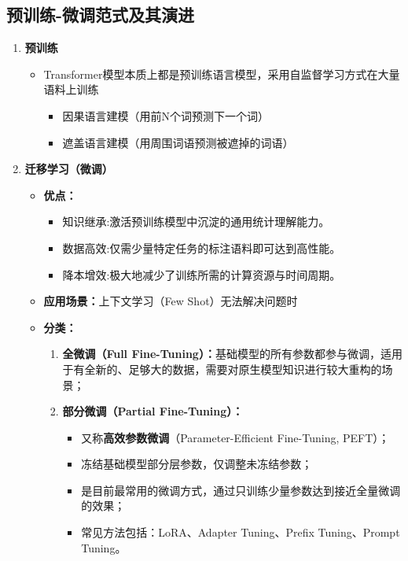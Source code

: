 \documentclass[../main.tex]{subfiles}
\begin{document}
\subsection{预训练-微调范式及其演进}
\begin{enumerate}
    \item \textbf{预训练}
    \begin{itemize}
        \item Transformer模型本质上都是预训练语言模型，采用自监督学习方式在大量语料上训练
        \begin{itemize}
            \item 因果语言建模（用前N个词预测下一个词）
            \item 遮盖语言建模（用周围词语预测被遮掉的词语）
        \end{itemize}
    \end{itemize}
    \item \textbf{迁移学习（微调）}
    \begin{itemize}
        \item \textbf{优点：}
        \begin{itemize}
            \item 知识继承:激活预训练模型中沉淀的通用统计理解能力。
            \item 数据高效:仅需少量特定任务的标注语料即可达到高性能。
            \item 降本增效:极大地减少了训练所需的计算资源与时间周期。
        \end{itemize}
        \item \textbf{应用场景：}上下文学习（Few Shot）无法解决问题时
        \item \textbf{分类：}
        \begin{enumerate}
            \item \textbf{全微调（Full Fine-Tuning）：}基础模型的所有参数都参与微调，适用于有全新的、足够大的数据，需要对原生模型知识进行较大重构的场景；
            
            \item \textbf{部分微调（Partial Fine-Tuning）：}
            \begin{itemize}
                \item 又称\textbf{高效参数微调}（Parameter-Efficient Fine-Tuning, PEFT）；
                \item 冻结基础模型部分层参数，仅调整未冻结参数；
                \item 是目前最常用的微调方式，通过只训练少量参数达到接近全量微调的效果；
                \item 常见方法包括：LoRA、Adapter Tuning、Prefix Tuning、Prompt Tuning。
            \end{itemize}
            

\end{enumerate}
\end{itemize}
\end{enumerate}
\end{document}
